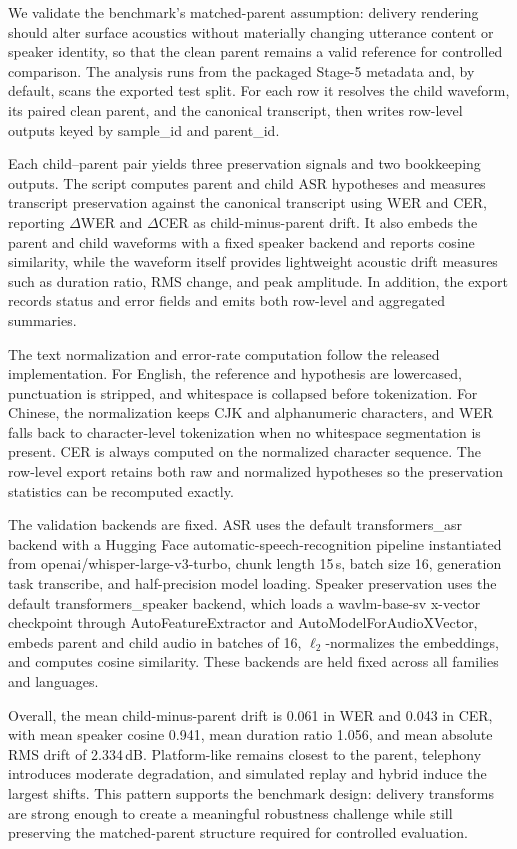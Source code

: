 We validate the benchmark's matched-parent assumption: delivery rendering should alter surface acoustics without materially changing utterance content or speaker identity, so that the clean parent remains a valid reference for controlled comparison. The analysis runs from the packaged Stage-5 metadata and, by default, scans the exported test split. For each row it resolves the child waveform, its paired clean parent, and the canonical transcript, then writes row-level outputs keyed by sample\_id and parent\_id.

Each child--parent pair yields three preservation signals and two bookkeeping outputs. The script computes parent and child ASR hypotheses and measures transcript preservation against the canonical transcript using WER and CER, reporting $\Delta$WER and $\Delta$CER as child-minus-parent drift. It also embeds the parent and child waveforms with a fixed speaker backend and reports cosine similarity, while the waveform itself provides lightweight acoustic drift measures such as duration ratio, RMS change, and peak amplitude. In addition, the export records status and error fields and emits both row-level and aggregated summaries.

The text normalization and error-rate computation follow the released implementation. For English, the reference and hypothesis are lowercased, punctuation is stripped, and whitespace is collapsed before tokenization. For Chinese, the normalization keeps CJK and alphanumeric characters, and WER falls back to character-level tokenization when no whitespace segmentation is present. CER is always computed on the normalized character sequence. The row-level export retains both raw and normalized hypotheses so the preservation statistics can be recomputed exactly.

The validation backends are fixed. ASR uses the default transformers\_asr backend with a Hugging Face automatic-speech-recognition pipeline instantiated from openai/whisper-large-v3-turbo, chunk length 15\,s, batch size 16, generation task transcribe, and half-precision model loading. Speaker preservation uses the default transformers\_speaker backend, which loads a wavlm-base-sv x-vector checkpoint through AutoFeatureExtractor and AutoModelForAudioXVector, embeds parent and child audio in batches of 16, $\ell_2$-normalizes the embeddings, and computes cosine similarity. These backends are held fixed across all families and languages.

Overall, the mean child-minus-parent drift is 0.061 in WER and 0.043 in CER, with mean speaker cosine 0.941, mean duration ratio 1.056, and mean absolute RMS drift of 2.334\,dB. Platform-like remains closest to the parent, telephony introduces moderate degradation, and simulated replay and hybrid induce the largest shifts. This pattern supports the benchmark design: delivery transforms are strong enough to create a meaningful robustness challenge while still preserving the matched-parent structure required for controlled evaluation.

